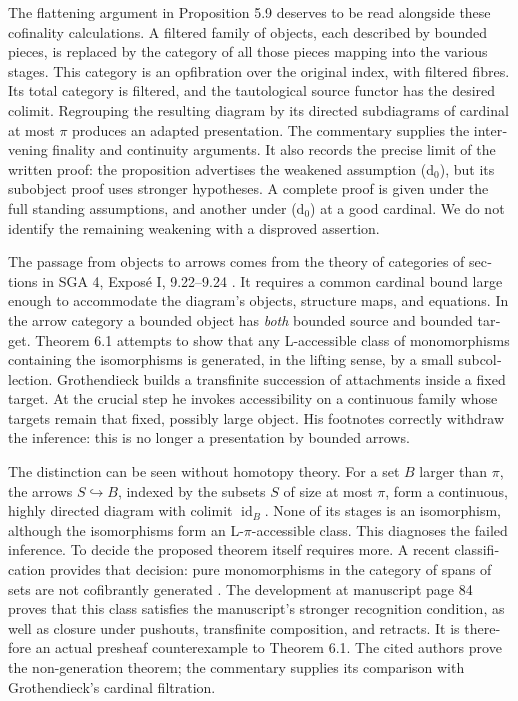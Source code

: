 \begin{otherlanguage}{english}
The flattening argument in Proposition 5.9 deserves to be read alongside these cofinality calculations. A filtered family of objects, each described by bounded pieces, is replaced by the category of all those pieces mapping into the various stages. This category is an opfibration over the original index, with filtered fibres. Its total category is filtered, and the tautological source functor has the desired colimit. Regrouping the resulting diagram by its directed subdiagrams of cardinal at most $\pi$ produces an adapted presentation. The commentary supplies the intervening finality and continuity arguments. It also records the precise limit of the written proof: the proposition advertises the weakened assumption (d$_0$), but its subobject proof uses stronger hypotheses. A complete proof is given under the full standing assumptions, and another under (d$_0$) at a good cardinal. We do not identify the remaining weakening with a disproved assertion.

The passage from objects to arrows comes from the theory of categories of sections in SGA 4, Expos\'e I, 9.22--9.24 \citep{SGA4I1972}. It requires a common cardinal bound large enough to accommodate the diagram's objects, structure maps, and equations. In the arrow category a bounded object has \emph{both} bounded source and bounded target. Theorem 6.1 attempts to show that any L-accessible class of monomorphisms containing the isomorphisms is generated, in the lifting sense, by a small subcollection. Grothendieck builds a transfinite succession of attachments inside a fixed target. At the crucial step he invokes accessibility on a continuous family whose targets remain that fixed, possibly large object. His footnotes correctly withdraw the inference: this is no longer a presentation by bounded arrows.

The distinction can be seen without homotopy theory. For a set $B$ larger than $\pi$, the arrows $S\hookrightarrow B$, indexed by the subsets $S$ of size at most $\pi$, form a continuous, highly directed diagram with colimit $\operatorname{id}_B$. None of its stages is an isomorphism, although the isomorphisms form an L-$\pi$-accessible class. This diagnoses the failed inference. To decide the proposed theorem itself requires more. A recent classification provides that decision: pure monomorphisms in the category of spans of sets are not cofibrantly generated \citep[Theorem 5.1]{CoxFeigertKamsmaMazariArmidaRosicky2026}. The development at manuscript page 84 proves that this class satisfies the manuscript's stronger recognition condition, as well as closure under pushouts, transfinite composition, and retracts. It is therefore an actual presheaf counterexample to Theorem 6.1. The cited authors prove the non-generation theorem; the commentary supplies its comparison with Grothendieck's cardinal filtration.


\end{otherlanguage}
